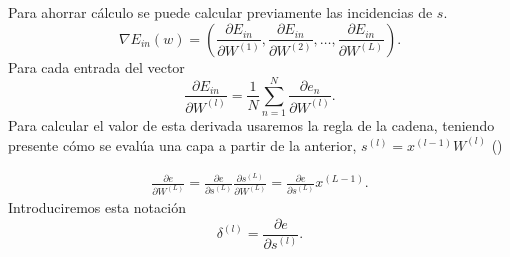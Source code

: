 Para ahorrar cálculo se puede calcular previamente las incidencias
de $s$.
\begin{equation}
    \nabla E_{in}(w) = 
    \left( 
        \frac{\partial E_{in}}{\partial W^{(1)}}, 
        \frac{\partial E_{in}}{\partial W^{(2)}},
        \ldots,
        \frac{\partial E_{in}}{\partial W^{(L)}}
    \right).
\end{equation}
Para cada entrada del vector
\begin{equation}
    \frac{\partial E_{in}}{\partial W^{(l)}}
    = \frac{1}{N} 
    \sum_{n=1}^N  \frac{\partial e_{n}}{\partial W^{(l)}}.
\end{equation}
Para calcular el valor de esta derivada usaremos la regla de la cadena, teniendo presente cómo se evalúa una capa a partir de la anterior,  $s^{(l)} = x^{(l-1)}W^{(l)}$ ()

\begin{align}
    \frac{\partial e}{\partial W^{(L)}} 
    = 
    \frac{\partial e}{\partial s^{(L)}} 
    \frac{\partial s^{(L)}}{\partial W^{(L)}}
    = 
    \frac{\partial e}{\partial s^{(L)}} 
    x^{(L-1)}. 
\end{align}
Introduciremos esta notación 
\begin{equation}
    \delta^{(l)}
    =
    \frac{\partial e}{\partial s^{(l)}}.
\end{equation}

